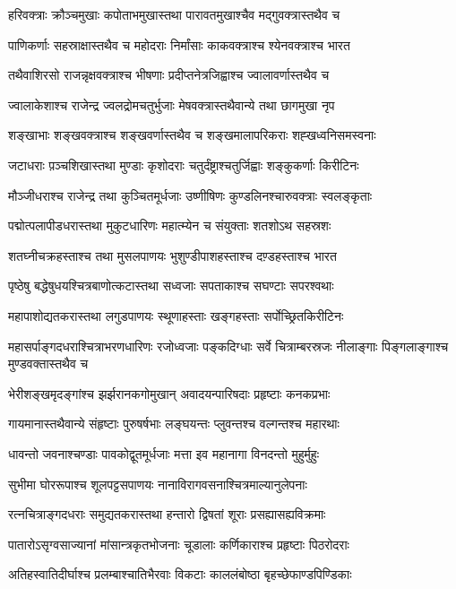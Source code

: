 \twolineshloka
{हरिवक्त्राः क्रौञ्चमुखाः कपोताभमुखास्तथा}
{पारावतमुखाश्चैव मद्गुवक्त्रास्तथैव च}


\twolineshloka
{पाणिकर्णाः सहस्राक्षास्तथैव च महोदराः}
{निर्मांसाः काकवक्त्राश्च श्येनवक्त्राश्च भारत}


\twolineshloka
{तथैवाशिरसो राजन्नृक्षवक्त्राश्च भीषणाः}
{प्रदीप्तनेत्रजिह्वाश्च ज्वालावर्णास्तथैव च}


\twolineshloka
{ज्वालाकेशाश्च राजेन्द्र ज्वलद्रोमचतुर्भुजाः}
{मेषवक्त्रास्तथैवान्ये तथा छागमुखा नृप}


\twolineshloka
{शङ्खाभाः शङ्खवक्त्राश्च शङ्खवर्णास्तथैव च}
{शङ्खमालापरिकराः शह्खध्वनिसमस्वनाः}


\twolineshloka
{जटाधराः प़ञ्चशिखास्तथा मुण्डाः कृशोदराः}
{चतुर्दंष्ट्राश्चतुर्जिह्वाः शङ्कुकर्णाः किरीटिनः}


\twolineshloka
{मौञ्जीधराश्च राजेन्द्र तथा कुञ्चितमूर्धजाः}
{उष्णीषिणः कुण्डलिनश्चारुवक्त्राः स्वलङ्कृताः}


\twolineshloka
{पद्मोत्पलापीडधरास्तथा मुकुटधारिणः}
{महात्म्येन च संयुक्ताः शतशोऽथ सहस्रशः}


\twolineshloka
{शतघ्नीचक्रहस्ताश्च तथा मुसलपाणयः}
{भुशुण्डीपाशहस्ताश्च दण़्डहस्ताश्च भारत}


\twolineshloka
{पृष्ठेषु बद्धेषुधयश्चित्रबाणोत्कटास्तथा}
{सध्वजाः सपताकाश्च सघण्टाः सपरश्वथाः}


\twolineshloka
{महापाशोद्यतकरास्तथा लगुडपाणयः}
{स्थूणाहस्ताः खङ्गहस्ताः सर्पोच्छ्रितकिरीटिनः}


\threelineshloka
{महासर्पाङ्गदधराश्चित्राभरणधारिणः}
{रजोध्वजाः पङ्कदिग्धाः सर्वे चित्राम्बरस्रजः}
{नीलाङ्गाः पिङ्गलाङ्गाश्च मुण्डवक्तास्तथैव च}


\twolineshloka
{भेरीशङ्खमृदङ्गांश्च झर्झरानकगोमुखान्}
{अवादयन्पारिषदाः प्रहृष्टाः कनकप्रभाः}


\twolineshloka
{गायमानास्तथैवान्ये संहृष्टाः पुरुषर्षभाः}
{लङ्घयन्तः प्लुवन्तश्च वल्गन्तश्च महारथाः}


\twolineshloka
{धावन्तो जवनाश्चण्डाः पावकोद्वूतमूर्धजाः}
{मत्ता इव महानागा विनदन्तो मुहुर्मुहुः}


\twolineshloka
{सुभीमा घोररूपाश्च शूलपट्टसपाणयः}
{नानाविरागवसनाश्चित्रमाल्यानुलेपनाः}


\twolineshloka
{रत्नचित्राङ्गदधराः समुद्यतकरास्तथा}
{हन्तारो द्विषतां शूराः प्रसह्यासह्यविक्रमाः}


\twolineshloka
{पातारोऽसृग्वसाज्यानां मांसान्त्रकृतभोजनाः}
{चूडालाः कर्णिकाराश्च प्रहृष्टाः पिठरोदराः}


\twolineshloka
{अतिहस्वातिदीर्घाश्च प्रलम्बाश्चातिभैरवाः}
{विकटाः काललंबोष्ठा बृहच्छेफाण्डपिण्डिकाः}


